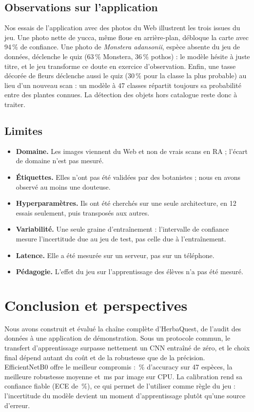 \documentclass[conference]{IEEEtran}
\newcommand{\todo}{\textcolor{red}{\textbf{??}}}
\newcommand{\nClasses}{47}\newcommand{\imbalance}{\todo}\newcommand{\nDup}{\todo}
\begin{document}
\subsection{Observations sur l'application}
Nos essais de l'application avec des photos du Web illustrent les trois issues du jeu. Une photo nette de yucca, même floue en arrière-plan, débloque la carte avec 94\,\% de confiance. Une photo de \emph{Monstera adansonii}, espèce absente du jeu de données, déclenche le quiz (63\,\% Monstera, 36\,\% pothos) : le modèle hésite à juste titre, et le jeu transforme ce doute en exercice d'observation. Enfin, une tasse décorée de fleurs déclenche aussi le quiz (30\,\% pour la classe la plus probable) au lieu d'un nouveau scan : un modèle à \nClasses{} classes répartit toujours sa probabilité entre des plantes connues. La détection des objets hors catalogue reste donc à traiter.

\subsection{Limites}
\begin{itemize}
\item \textbf{Domaine.} Les images viennent du Web et non de vrais scans en RA ; l'écart de domaine n'est pas mesuré.
\item \textbf{Étiquettes.} Elles n'ont pas été validées par des botanistes ; nous en avons observé au moins une douteuse.
\item \textbf{Hyperparamètres.} Ils ont été cherchés sur une seule architecture, en 12 essais seulement, puis transposés aux autres.
\item \textbf{Variabilité.} Une seule graine d'entraînement : l'intervalle de confiance mesure l'incertitude due au jeu de test, pas celle due à l'entraînement.
\item \textbf{Latence.} Elle a été mesurée sur un serveur, pas sur un téléphone.
\item \textbf{Pédagogie.} L'effet du jeu sur l'apprentissage des élèves n'a pas été mesuré.
\end{itemize}

\section{Conclusion et perspectives}\label{sec:concl}
Nous avons construit et évalué la chaîne complète d'HerbaQuest, de l'audit des données à une application de démonstration. Sous un protocole commun, le transfert d'apprentissage surpasse nettement un CNN entraîné de zéro, et le choix final dépend autant du coût et de la robustesse que de la précision. EfficientNetB0 offre le meilleur compromis : \bestAcc\,\% d'accuracy sur \nClasses{} espèces, la meilleure robustesse moyenne et \bestCpu\,ms par image sur CPU. La calibration rend sa confiance fiable (ECE de \eceAfter\,\%), ce qui permet de l'utiliser comme règle du jeu : l'incertitude du modèle devient un moment d'apprentissage plutôt qu'une source d'erreur.
\end{document}
